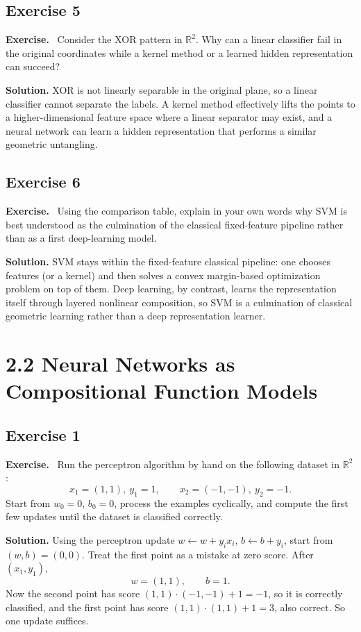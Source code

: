 \documentclass[11pt]{article}
\newenvironment{exercisebox}{\begin{framed}\noindent\textbf{Exercise.}\ }{\end{framed}}
\begin{document}
\subsection*{Exercise 5}
\begin{exercisebox}
Consider the XOR pattern in $\mathbb R^2$. Why can a linear classifier fail in the original coordinates while a kernel method or a learned hidden representation can succeed?
\end{exercisebox}
\textbf{Solution.} XOR is not linearly separable in the original plane, so a linear classifier cannot separate the labels. A kernel method effectively lifts the points to a higher-dimensional feature space where a linear separator may exist, and a neural network can learn a hidden representation that performs a similar geometric untangling.

\subsection*{Exercise 6}
\begin{exercisebox}
Using the comparison table, explain in your own words why SVM is best understood as the culmination of the classical fixed-feature pipeline rather than as a first deep-learning model.
\end{exercisebox}
\textbf{Solution.} SVM stays within the fixed-feature classical pipeline: one chooses features (or a kernel) and then solves a convex margin-based optimization problem on top of them. Deep learning, by contrast, learns the representation itself through layered nonlinear composition, so SVM is a culmination of classical geometric learning rather than a deep representation learner.

\section{2.2 Neural Networks as Compositional Function Models}
\subsection*{Exercise 1}
\begin{exercisebox}
Run the perceptron algorithm by hand on the following dataset in $\mathbb R^2$:
\[
x_1=(1,1),\ y_1=1,
\qquad
x_2=(-1,-1),\ y_2=-1.
\]
Start from $w_0=0$, $b_0=0$, process the examples cyclically, and compute the first few updates until the dataset is classified correctly.
\end{exercisebox}
\textbf{Solution.} Using the perceptron update $w\leftarrow w+y_ix_i$, $b\leftarrow b+y_i$, start from $(w,b)=(0,0)$. Treat the first point as a mistake at zero score. After $(x_1,y_1)$,
\[
w=(1,1),\qquad b=1.
\]
Now the second point has score $(1,1)\cdot(-1,-1)+1=-1$, so it is correctly classified, and the first point has score $(1,1)\cdot(1,1)+1=3$, also correct. So one update suffices.
\end{document}
